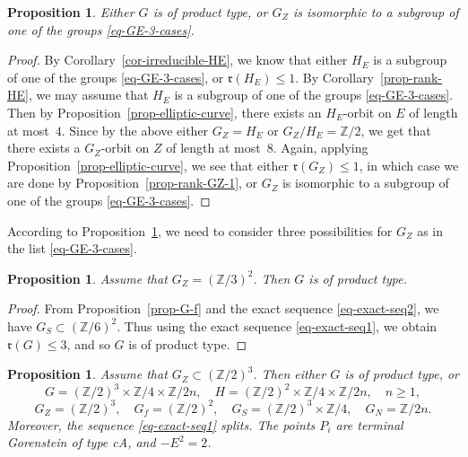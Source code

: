 \documentclass[11pt]{amsart}
\numberwithin{equation}{section}
\newtheorem{proposition}[thm]{Proposition}
\theoremstyle{definition}
\theoremstyle{remark}
\begin{document}
\begin{proposition}
\label{prop-reduction-for-GZ}
Either $G$ is of product type, or $G_Z$ is isomorphic to a subgroup of one of the groups \eqref{eq-GE-3-cases}.
\end{proposition}

\begin{proof}
By Corollary~\ref{cor-irreducible-HE}, we know that either $H_E$ is a subgroup of one of the groups \eqref{eq-GE-3-cases}, or $\mathfrak{r}(H_E)\leq 1$.  
By Corollary~\ref{prop-rank-HE}, we may assume that $H_E$ is a subgroup of one of the groups \eqref{eq-GE-3-cases}. Then by Proposition~\ref{prop-elliptic-curve}, there exists an $H_E$-orbit on $E$ of length at most~$4$. 
Since by the above either $G_Z=H_E$ or $G_Z/H_E=\mathbb{Z}/2$, we get that there exists a $G_Z$-orbit on $Z$ of length at most~$8$. Again, applying Proposition~\ref{prop-elliptic-curve}, we see that either $\mathfrak{r}(G_Z)\leq 1$, in which case we are done by Proposition~\ref{prop-rank-GZ-1}, or $G_Z$ is isomorphic to a subgroup of one of the groups \eqref{eq-GE-3-cases}. 
\end{proof}

According to Proposition~\ref{prop-reduction-for-GZ}, we need to consider three possibilities for $G_Z$ as in the list \eqref{eq-GE-3-cases}. 

\begin{proposition}
\label{prop-GE-2}
Assume that $G_Z=(\mathbb{Z}/3)^2$. Then $G$ is of product type. 
\end{proposition}

\begin{proof}
From Proposition~\ref{prop-G-f} and the exact sequence \eqref{eq-exact-seq2}, we have $G_S\subset (\mathbb{Z}/6)^2$. Thus using the exact sequence \eqref{eq-exact-seq1}, we obtain $\mathfrak{r}(G)\leq 3$, and so $G$ is of product type. 
\end{proof}

\begin{proposition}
\label{prop-GE-1}
Assume that $G_Z\subset(\mathbb{Z}/2)^3$. Then either $G$ is of product type, or
\begin{equation}
G=(\mathbb{Z}/2)^3\times \mathbb{Z}/4 \times \mathbb{Z}/2n, \quad H=(\mathbb{Z}/2)^2\times \mathbb{Z}/4\times \mathbb{Z}/2n,  \quad n\geq 1,
\end{equation}
\[
G_Z=(\mathbb{Z}/2)^3,  \quad G_f=(\mathbb{Z}/2)^2,  \quad G_S = (\mathbb{Z}/2)^3\times \mathbb{Z}/4,  \quad G_N = \mathbb{Z}/2n. 
\]
Moreover, the sequence \eqref{eq-exact-seq1} splits.  
The points $P_i$ are terminal Gorenstein of type cA, and $-E^2=2$. 
\end{proposition}
\end{document}
